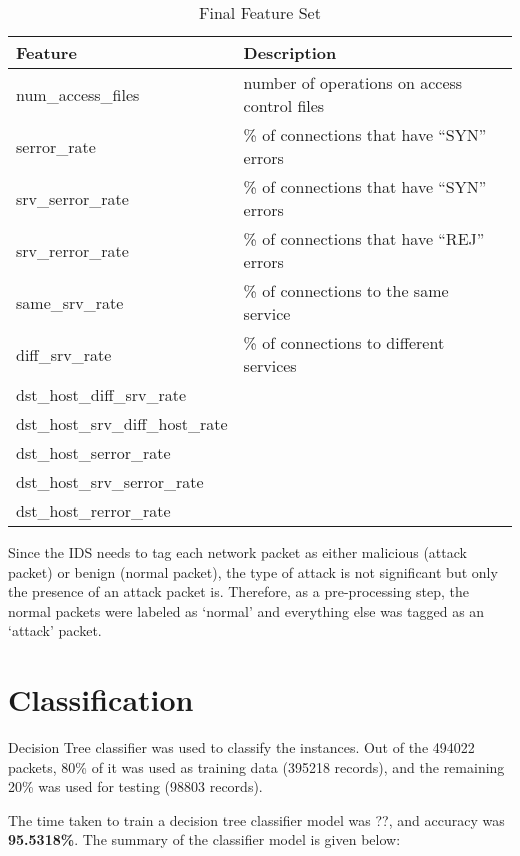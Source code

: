 \documentclass[11pt]{article}
\begin{document}
\begin{table}
\caption{Final Feature Set}
\centering
\begin{tabular}{l*{2}{l}}
Feature & Description \\
\hline
num\_access\_files & number of operations on access control files  \\
serror\_rate & \% of connections that have ``SYN'' errors  \\
srv\_serror\_rate & \% of connections that have ``SYN'' errors  \\
srv\_rerror\_rate & \% of connections that have ``REJ'' errors  \\
same\_srv\_rate & \% of connections to the same service \\
diff\_srv\_rate & \% of connections to different services \\
dst\_host\_diff\_srv\_rate &  \\
dst\_host\_srv\_diff\_host\_rate &  \\
dst\_host\_serror\_rate &  \\
dst\_host\_srv\_serror\_rate &  \\
dst\_host\_rerror\_rate &  \\
\end{tabular}
\label{Tab:features}
\end{table}

Since the IDS needs to tag each network packet as either malicious (attack packet) or benign (normal packet), the type of attack is not significant but only the presence of an attack packet is. Therefore, as a pre-processing step, the normal packets were labeled as `normal' and everything else was tagged as an `attack' packet.

\section{Classification}
Decision Tree classifier was used to classify the instances. Out of the 494022 packets, 80\% of it was used as training data (395218 records), and the remaining 20\% was used for testing (98803 records).

The time taken to train a decision tree classifier model was ??, and accuracy was {\bf 95.5318\%}. The summary of the classifier model is given below:
\end{document}
